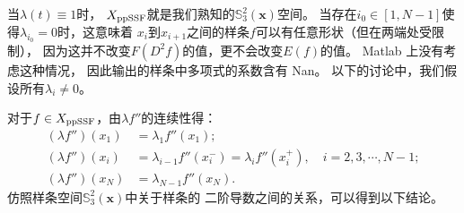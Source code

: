   当$\lambda(t)\equiv1$时，
  $X_{\textnormal{ppSSF}}$就是我们熟知的$\mathbb{S}_{3}^{2}(\mathbf{x})$空间。
  当存在$i_{0}\in[1,N-1]$使得$\lambda_{i_{0}}=0$时，这意味着
  $x_{i}$到$x_{i+1}$之间的样条$f$可以有任意形状（但在两端处受限制），
  因为这并不改变$F(D^{2}f)$的值，更不会改变$E(f)$的值。
  Matlab 上没有考虑这种情况，
  因此输出的样条中多项式的系数含有 Nan。
  以下的讨论中，我们假设所有$\lambda_{i}\neq 0$。

  对于$f\in X_{\textnormal{ppSSF}}$，由$\lambda f''$的连续性得：
  \begin{align*}
    (\lambda f'')(x_{1})&=\lambda_{1}f''(x_{1});\\
    (\lambda f'')(x_{i})&=\lambda_{i-1}f''(x_{i}^{-})
  =\lambda_{i}f''(x_{i}^{+}),\quad i=2,3,\cdots, N-1;\\
  (\lambda f'')(x_{N})&=\lambda_{N-1}f''(x_{N}).
  \end{align*}
  仿照样条空间$\mathbb{S}_{3}^{2}(\mathbf{x})$中关于样条的
  二阶导数之间的关系，可以得到以下结论。

